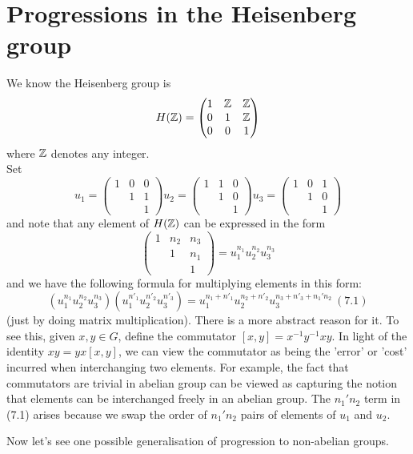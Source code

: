 \documentclass[a4paper]{article}
\begin{document}
\section{Progressions in the Heisenberg group}

We know the Heisenberg group is
\[
H(\mathbb{Z}) = \begin{pmatrix}
1 & \mathbb{Z} & \mathbb{Z}\\
0 & 1 & \mathbb{Z}\\
0 & 0 & 1
\end{pmatrix}
\]
where $\mathbb{Z}$ denotes any integer.\\
Set 
\[
u_1 = \begin{pmatrix}
1&0&0\\
&1&1\\
&&1
\end{pmatrix}
u_2 = \begin{pmatrix}
1&1&0\\
&1&0\\
&&1
\end{pmatrix}
u_3 = \begin{pmatrix}
1&0&1\\
&1&0\\
&&1
\end{pmatrix}
\]
and note that any element of $H(\mathbb{Z})$ can be expressed in the form
\[
\begin{pmatrix}
1&n_2&n_3\\
&1&n_1\\
&&1
\end{pmatrix}
= u_1^{n_1}u_2^{n_2}u_3^{n_3}
\]
and we have the following formula for multiplying elements in this form:
\[
(u_1^{n_1}u_2^{n_2}u_3^{n_3})(u_1^{n'_1}u_2^{n'_2}u_3^{n'_3}) = u_1^{n_1+n'_1}u_2^{n_2+n'_2}u_3^{n_3+n'_3+n_1'n_2} \ (7.1)
\]
(just by doing matrix multiplication). There is a more abstract reason for it. To see this, given $x,y \in G$, define the commutator $[x,y] = x^{-1}y^{-1}xy$. In light of the identity $xy = yx[x,y]$, we can view the commutator as being the 'error' or 'cost' incurred when interchanging two elements. For example, the fact that commutators are trivial in abelian group can be viewed as capturing the notion that elements can be interchanged freely in an abelian group. The $n_1'n_2$ term in (7.1) arises because we swap the order of $n_1'n_2$ pairs of elements of $u_1$ and $u_2$.

Now let's see one possible generalisation of progression to non-abelian groups.
\end{document}
